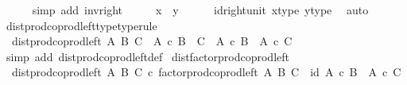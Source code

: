 \begin{isabellebody}
\ \ \ \ \isamarkupfalse%
\ {\isacharparenleft}{\kern0pt}simp\ add{\isacharcolon}{\kern0pt}\ inv{\isacharunderscore}{\kern0pt}right{\isacharparenright}{\kern0pt}\isanewline
\ \ \isamarkupfalse%
\ \isamarkupfalse%
\ {\isachardoublequoteopen}x\ {\isacharequal}{\kern0pt}\ y{\isachardoublequoteclose}\isanewline
\ \ \ \ \isamarkupfalse%
\ id{\isacharunderscore}{\kern0pt}right{\isacharunderscore}{\kern0pt}unit{}\ x{\isacharunderscore}{\kern0pt}type\ y{\isacharunderscore}{\kern0pt}type\ \isamarkupfalse%
\ auto\isanewline
{}\isamarkupfalse%
%
\endisatagproof
{\isafoldproof}%
%
\isadelimproof
\isanewline
%
\endisadelimproof
\isanewline
{}\isamarkupfalse%
\ dist{\isacharunderscore}{\kern0pt}prod{\isacharunderscore}{\kern0pt}coprod{\isacharunderscore}{\kern0pt}left{\isacharunderscore}{\kern0pt}type{\isacharbrackleft}{\kern0pt}type{\isacharunderscore}{\kern0pt}rule{\isacharbrackright}{\kern0pt}{\isacharcolon}{\kern0pt}\isanewline
\ \ {\isachardoublequoteopen}dist{\isacharunderscore}{\kern0pt}prod{\isacharunderscore}{\kern0pt}coprod{\isacharunderscore}{\kern0pt}left\ A\ B\ C\ {\isacharcolon}{\kern0pt}\ A\ {\isasymtimes}\isactrlsub c\ {\isacharparenleft}{\kern0pt}B\ {\isasymCoprod}\ C{\isacharparenright}{\kern0pt}\ {\isasymrightarrow}\ {\isacharparenleft}{\kern0pt}A\ {\isasymtimes}\isactrlsub c\ B{\isacharparenright}{\kern0pt}\ {\isasymCoprod}\ {\isacharparenleft}{\kern0pt}A\ {\isasymtimes}\isactrlsub c\ C{\isacharparenright}{\kern0pt}{\isachardoublequoteclose}\isanewline
%
\isadelimproof
\ \ %
\endisadelimproof
%
\isatagproof
{}\isamarkupfalse%
\ {\isacharparenleft}{\kern0pt}simp\ add{\isacharcolon}{\kern0pt}\ dist{\isacharunderscore}{\kern0pt}prod{\isacharunderscore}{\kern0pt}coprod{\isacharunderscore}{\kern0pt}left{\isacharunderscore}{\kern0pt}def{}{\isacharparenright}{\kern0pt}%
\endisatagproof
{\isafoldproof}%
%
\isadelimproof
\isanewline
%
\endisadelimproof
\isanewline
{}\isamarkupfalse%
\ dist{\isacharunderscore}{\kern0pt}factor{\isacharunderscore}{\kern0pt}prod{\isacharunderscore}{\kern0pt}coprod{\isacharunderscore}{\kern0pt}left{\isacharcolon}{\kern0pt}\isanewline
\ \ {\isachardoublequoteopen}dist{\isacharunderscore}{\kern0pt}prod{\isacharunderscore}{\kern0pt}coprod{\isacharunderscore}{\kern0pt}left\ A\ B\ C\ {\isasymcirc}\isactrlsub c\ factor{\isacharunderscore}{\kern0pt}prod{\isacharunderscore}{\kern0pt}coprod{\isacharunderscore}{\kern0pt}left\ A\ B\ C\ {\isacharequal}{\kern0pt}\ id\ {\isacharparenleft}{\kern0pt}{\isacharparenleft}{\kern0pt}A\ {\isasymtimes}\isactrlsub c\ B{\isacharparenright}{\kern0pt}\ {\isasymCoprod}\ {\isacharparenleft}{\kern0pt}A\ {\isasymtimes}\isactrlsub c\ C{\isacharparenright}{\kern0pt}{\isacharparenright}{\kern0pt}{\isachardoublequoteclose}\isanewline

\end{isabellebody}
